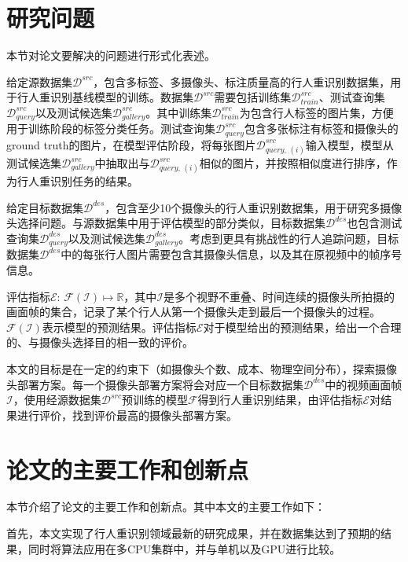 \section{研究问题}

本节对论文要解决的问题进行形式化表述。

给定源数据集$\mathcal{D}^{src}$，包含多标签、多摄像头、标注质量高的行人重识别数据集，用于行人重识别基线模型的训练。数据集$\mathcal{D}^{src}$需要包括训练集$\mathcal{D}_{train}^{src}$、测试查询集$\mathcal{D}_{query}^{src}$以及测试候选集$\mathcal{D}_{gallery}^{src}$。其中训练集$\mathcal{D}_{train}^{src}$为包含行人标签的图片集，方便用于训练阶段的标签分类任务。测试查询集$\mathcal{D}_{query}^{src}$包含多张标注有标签和摄像头的ground truth的图片，在模型评估阶段，将每张图片$\mathcal{D}_{query,\,(i)}^{src}$输入模型，模型从测试候选集$\mathcal{D}_{gallery}^{src}$中抽取出与$\mathcal{D}_{query,\,(i)}^{src}$相似的图片，并按照相似度进行排序，作为行人重识别任务的结果。

给定目标数据集$\mathcal{D}^{des}$，包含至少10个摄像头的行人重识别数据集，用于研究多摄像头选择问题。与源数据集中用于评估模型的部分类似，目标数据集$\mathcal{D}^{des}$也包含测试查询集$\mathcal{D}_{query}^{des}$以及测试候选集$\mathcal{D}_{gallery}^{des}$。考虑到更具有挑战性的行人追踪问题，目标数据集$\mathcal{D}^{des}$中的每张行人图片需要包含其摄像头信息，以及其在原视频中的帧序号信息。

评估指标$\mathcal{E}:\,\mathcal{F}(\mathcal{I})\mapsto\mathbb{R}$，其中$\mathcal{I}$是多个视野不重叠、时间连续的摄像头所拍摄的画面帧的集合，记录了某个行人从第一个摄像头走到最后一个摄像头的过程。$\mathcal{F}(\mathcal{I})$表示模型的预测结果。评估指标$\mathcal{E}$对于模型给出的预测结果，给出一个合理的、与摄像头选择目的相一致的评价。

本文的目标是在一定的约束下（如摄像头个数、成本、物理空间分布），探索摄像头部署方案。每一个摄像头部署方案将会对应一个目标数据集$\mathcal{D}^{des}$中的视频画面帧$\mathcal{I}$，使用经源数据集$\mathcal{D}^{src}$预训练的模型$\mathcal{F}$得到行人重识别结果，由评估指标$\mathcal{E}$对结果进行评价，找到评价最高的摄像头部署方案。

\section{论文的主要工作和创新点}

本节介绍了论文的主要工作和创新点。其中本文的主要工作如下：

首先，本文实现了行人重识别领域最新的研究成果\cite{sun2017beyond}，并在数据集\cite{zheng2015scalable}达到了预期的结果，同时将算法应用在多CPU集群中，并与单机以及GPU进行比较。

